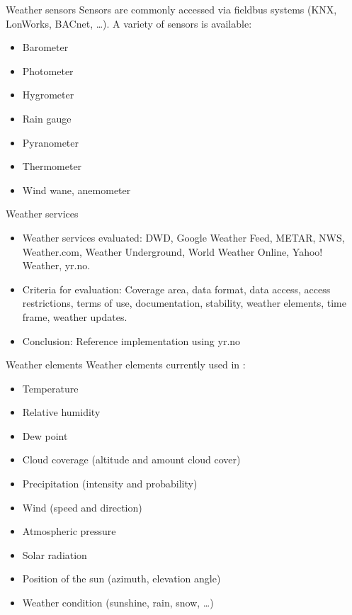 \documentclass{beamer}
\begin{document}
\begin{frame}{Weather sensors}
	Sensors are commonly accessed via fieldbus systems (KNX, LonWorks, BACnet, …).
	A variety of sensors is available:
	\begin{itemize}
		\item Barometer
		\item Photometer
		\item Hygrometer
		\item Rain gauge
		\item Pyranometer
		\item Thermometer
		\item Wind wane, anemometer
	\end{itemize}
\end{frame}

\begin{frame}{Weather services}
	\begin{itemize}
		\item Weather services evaluated: DWD, Google Weather Feed, METAR, NWS, Weather.com, Weather Underground, World Weather Online, Yahoo! Weather, yr.no.
		\item Criteria for evaluation: Coverage area, data format, data access, access restrictions, terms of use, documentation, stability, weather elements, time frame, weather updates.
		\item Conclusion: Reference implementation using yr.no
	\end{itemize}
\end{frame}

\begin{frame}{Weather elements}
	Weather elements currently used in \smarthomeweather:
	\begin{itemize}
		\item Temperature
		\item Relative humidity
		\item Dew point
		\item Cloud coverage (altitude and amount cloud cover)
		\item Precipitation (intensity and probability)
		\item Wind (speed and direction)
		\item Atmospheric pressure
		\item Solar radiation
		\item Position of the sun (azimuth, elevation angle)
		\item Weather condition (sunshine, rain, snow, …)
	\end{itemize}
\end{frame}
\end{document}
